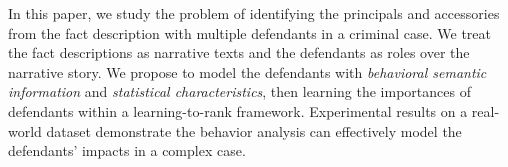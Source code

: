 In this paper, we study the problem of identifying the principals and accessories from the fact description with multiple defendants in a criminal case. We treat the fact descriptions as narrative texts and the defendants as roles over the narrative story. We propose to model the defendants with \emph{behavioral semantic information} and \emph{statistical characteristics}, then learning the importances of defendants within a learning-to-rank framework. Experimental results on a real-world dataset demonstrate the behavior analysis can effectively model the defendants' impacts in a complex case.
